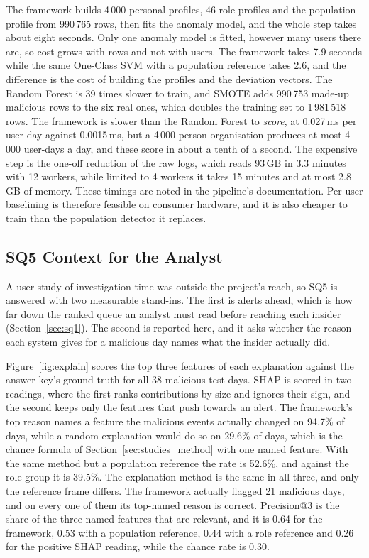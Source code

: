 \documentclass[a4paper,12pt]{article}
\begin{document}
The framework builds 4\,000 personal profiles, 46 role profiles and the population profile from 990\,765 rows, then fits the anomaly model, and the whole step takes about eight seconds. Only one anomaly model is fitted, however many users there are, so cost grows with rows and not with users. The framework takes 7.9 seconds while the same One-Class SVM with a population reference takes 2.6, and the difference is the cost of building the profiles and the deviation vectors. The Random Forest is 39 times slower to train, and SMOTE adds 990\,753 made-up malicious rows to the six real ones, which doubles the training set to 1\,981\,518 rows. The framework is slower than the Random Forest to \emph{score}, at 0.027\,ms per user-day against 0.0015\,ms, but a 4\,000-person organisation produces at most 4\,000 user-days a day, and these score in about a tenth of a second. The expensive step is the one-off reduction of the raw logs, which reads 93\,GB in 3.3 minutes with 12 workers, while limited to 4 workers it takes 15 minutes and at most 2.8\,GB of memory. These timings are noted in the pipeline's documentation. Per-user baselining is therefore feasible on consumer hardware, and it is also cheaper to train than the population detector it replaces.

\subsection{SQ5 Context for the Analyst}
\label{sec:sq5}
A user study of investigation time was outside the project's reach, so SQ5 is answered with two measurable stand-ins. The first is alerts ahead, which is how far down the ranked queue an analyst must read before reaching each insider (Section~\ref{sec:sq1}). The second is reported here, and it asks whether the reason each system gives for a malicious day names what the insider actually did.

Figure~\ref{fig:explain} scores the top three features of each explanation against the answer key's ground truth for all 38 malicious test days. SHAP is scored in two readings, where the first ranks contributions by size and ignores their sign, and the second keeps only the features that push towards an alert. The framework's top reason names a feature the malicious events actually changed on 94.7\% of days, while a random explanation would do so on 29.6\% of days, which is the chance formula of Section~\ref{sec:studies_method} with one named feature. With the same method but a population reference the rate is 52.6\%, and against the role group it is 39.5\%. The explanation method is the same in all three, and only the reference frame differs. The framework actually flagged 21 malicious days, and on every one of them its top-named reason is correct. Precision@3 is the share of the three named features that are relevant, and it is 0.64 for the framework, 0.53 with a population reference, 0.44 with a role reference and 0.26 for the positive SHAP reading, while the chance rate is 0.30.
\end{document}
